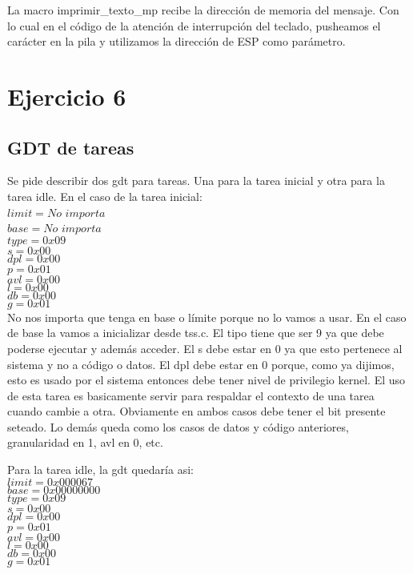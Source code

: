 \documentclass[a4paper]{article}
\begin{document}
La macro imprimir\_texto\_mp recibe la dirección de memoria del mensaje. Con lo cual en el código de la atención de interrupción del teclado, pusheamos el carácter en la pila y utilizamos la dirección de ESP como parámetro.  

\section{Ejercicio 6}

\subsection{GDT de tareas}

Se pide describir dos gdt para tareas. Una para la tarea inicial y otra para la tarea idle. En el caso de la tarea inicial:\\
$limit=No$ $importa$\\
$base=No$ $importa$\\
$type=0x09$\\
$s=0x00$\\
$dpl=0x00$\\
$p=0x01$\\
$avl=0x00$\\
$l=0x00$\\ 
$db=0x00$\\
$g=0x01$\\   

No nos importa que tenga en base o límite porque no lo vamos a usar. En el caso de base la vamos a inicializar desde tss.c. El tipo tiene que ser 9 ya que debe poderse ejecutar y además acceder. El s debe estar en 0 ya que esto pertenece al sistema y no a código o datos. El dpl debe estar en 0 porque, como ya dijimos, esto es usado por el sistema entonces debe tener nivel de privilegio kernel. El uso de esta tarea es basicamente servir para respaldar el contexto de una tarea cuando cambie a otra. Obviamente en ambos casos debe tener el bit presente seteado. Lo demás queda como los casos de datos y código anteriores, granularidad en 1, avl en 0, etc. 

Para la tarea idle, la gdt quedaría asi:\\
$limit=0x000067$\\
$base=0x00000000$\\
$type=0x09$\\
$s=0x00$\\
$dpl=0x00$\\
$p=0x01$\\
$avl=0x00$\\
$l=0x00$\\
$db=0x00$\\
$g=0x01$\\   
\end{document}
